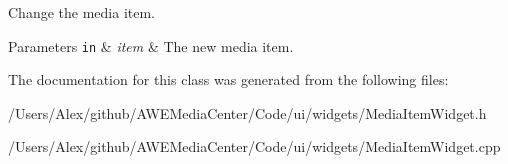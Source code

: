 Change the media item. 


\begin{DoxyParams}[1]{Parameters}
\mbox{\tt in}  & {\em item} & The new media item. \\
\hline
\end{DoxyParams}


The documentation for this class was generated from the following files\-:\begin{DoxyCompactItemize}
\item 
/\-Users/\-Alex/github/\-A\-W\-E\-Media\-Center/\-Code/ui/widgets/Media\-Item\-Widget.\-h\item 
/\-Users/\-Alex/github/\-A\-W\-E\-Media\-Center/\-Code/ui/widgets/Media\-Item\-Widget.\-cpp\end{DoxyCompactItemize}
